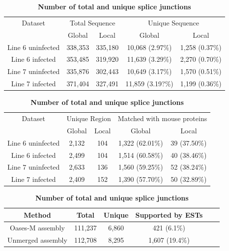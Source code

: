 \documentclass[10pt]{article}
\begin{document}
\begin{table}[!ht]
\caption{
\bf{Unique sequences from global and local assembly}}
\begin{tabular}{ccccc}
\hline
Dataset & \multicolumn{2}{c}{Total Sequence} & \multicolumn{2}{c}{Unique Sequence}\\
 & Global & Local & Global & Local\\
\hline
Line 6 uninfected & 338,353 & 335,180 & 10,068 (2.97\%) & 1,258 (0.37\%)\\
Line 6 infected & 353,485 & 319,920 & 11,639 (3.29\%)& 2,270 (0.70\%)\\
Line 7 uninfected & 335,876 & 302,443 & 10,649 (3.17\%) & 1,570 (0.51\%)\\
Line 7 infected & 371,404 & 327,491 & 11,859 (3.19?\%)& 1,199 (0.36\%)\\
\hline
\end{tabular}
\label{unique_sequences}

\caption{
\bf{Unique regions from global and local assembly}}
\begin{tabular}{ccccc}
\hline
Dataset & \multicolumn{2}{c}{Unique Region} & \multicolumn{2}{c}{Matched with mouse proteins}\\
 & Global & Local & Global & Local\\
\hline
Line 6 uninfected & 2,132 & 104 & 1,322 (62.01\%) & 39 (37.50\%)\\
Line 6 infected & 2,499 & 104 & 1,514 (60.58\%)& 40 (38.46\%)\\
Line 7 uninfected & 2,633 & 136 & 1,560 (59.25\%) & 52 (38.24\%)\\
Line 7 infected & 2,409 & 152 & 1,390 (57.70\%)& 50 (32.89\%)\\
\hline
\end{tabular}
\label{unique_sequences_matched_mouse}

\caption{
\bf{Number of total and unique splice junctions}}
\begin{tabular}{cccccc}
\hline
Method& Total & Unique & Supported by ESTs \\ 
\hline
Oases-M assembly & 111,237 & 6,860 & 421 (6.1\%) \\
Unmerged assembly & 112,708 & 8,295 & 1,607 (19.4\%) \\
\hline
\end{tabular}
\label{Oases-M}


\end{table}
\end{document}
